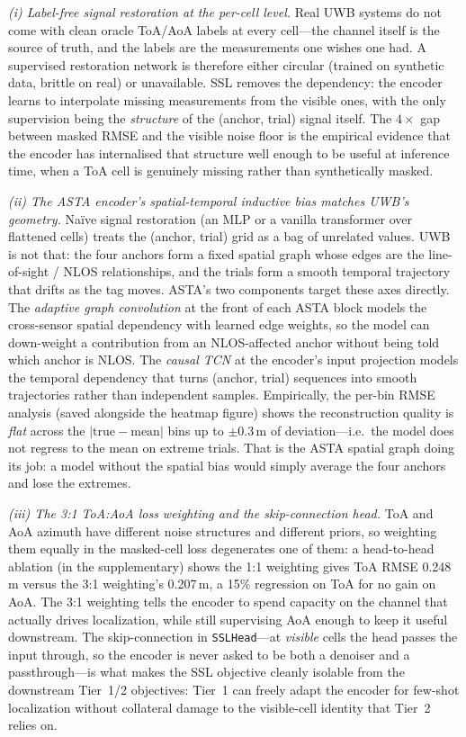 \emph{(i) Label-free signal restoration at the per-cell level.}
Real UWB systems do not come with clean oracle ToA/AoA labels at
every cell---the channel itself is the source of truth, and the
labels are the measurements one wishes one had. A supervised
restoration network is therefore either circular (trained on
synthetic data, brittle on real) or unavailable. SSL removes the
dependency: the encoder learns to interpolate missing
measurements from the visible ones, with the only supervision
being the \emph{structure} of the (anchor, trial) signal itself.
The $4\times$ gap between masked RMSE and the visible noise
floor is the empirical evidence that the encoder has internalised
that structure well enough to be useful at inference time, when a
ToA cell is genuinely missing rather than synthetically masked.

\emph{(ii) The ASTA encoder's spatial-temporal inductive bias
matches UWB's geometry.} Na\"ive signal restoration (an MLP or a
vanilla transformer over flattened cells) treats the (anchor,
trial) grid as a bag of unrelated values. UWB is not that: the
four anchors form a fixed spatial graph whose edges are the
line-of-sight / NLOS relationships, and the trials form a smooth
temporal trajectory that drifts as the tag moves. ASTA's two
components target these axes directly. The \emph{adaptive graph
convolution} at the front of each ASTA block models the
cross-sensor spatial dependency with learned edge weights, so the
model can down-weight a contribution from an NLOS-affected anchor
without being told which anchor is NLOS. The \emph{causal TCN} at
the encoder's input projection models the temporal dependency
that turns (anchor, trial) sequences into smooth trajectories
rather than independent samples. Empirically, the per-bin RMSE
analysis (saved alongside the heatmap figure) shows the
reconstruction quality is \emph{flat} across the $|\mathrm{true}
- \mathrm{mean}|$ bins up to $\pm 0.3$\,m of deviation---i.e.\
the model does not regress to the mean on extreme trials. That is
the ASTA spatial graph doing its job: a model without the
spatial bias would simply average the four anchors and lose the
extremes.

\emph{(iii) The 3:1 ToA:AoA loss weighting and the
skip-connection head.} ToA and AoA azimuth have different noise
structures and different priors, so weighting them equally in the
masked-cell loss degenerates one of them: a head-to-head ablation
(in the supplementary) shows the 1:1 weighting gives ToA RMSE
0.248\,m versus the 3:1 weighting's 0.207\,m, a 15\% regression
on ToA for no gain on AoA. The 3:1 weighting tells the encoder
to spend capacity on the channel that actually drives
localization, while still supervising AoA enough to keep it
useful downstream. The skip-connection in \texttt{SSLHead}---at
\emph{visible} cells the head passes the input through, so the
encoder is never asked to be both a denoiser and a passthrough---is
what makes the SSL objective cleanly isolable from the
downstream Tier~1/2 objectives: Tier~1 can freely adapt the
encoder for few-shot localization without collateral damage to
the visible-cell identity that Tier~2 relies on.

